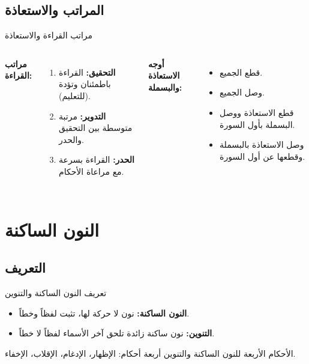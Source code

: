 \documentclass[aspectratio=169, 12pt]{beamer}
\begin{document}
\subsection{المراتب والاستعاذة}
\begin{frame}{مراتب القراءة والاستعاذة}
    \begin{columns}
        \textbf{مراتب القراءة:}
        \begin{enumerate}
            \item \textbf{التحقيق:} القراءة باطمئنان وتؤدة (للتعليم).
            \item \textbf{التدوير:} مرتبة متوسطة بين التحقيق والحدر.
            \item \textbf{الحدر:} القراءة بسرعة مع مراعاة الأحكام.
        \end{enumerate}

        \textbf{أوجه الاستعاذة والبسملة:}
        \begin{itemize}
            \item قطع الجميع.
            \item وصل الجميع.
            \item قطع الاستعاذة ووصل البسملة بأول السورة.
            \item وصل الاستعاذة بالبسملة وقطعها عن أول السورة.
        \end{itemize}
    \end{columns}
\end{frame}

\section{النون الساكنة}
\subsection{التعريف}

\begin{frame}{تعريف النون الساكنة والتنوين}
    \begin{itemize}
        \item \textbf{النون الساكنة:} نون لا حركة لها، تثبت لفظاً وخطاً.
        \item \textbf{التنوين:} نون ساكنة زائدة تلحق آخر الأسماء لفظاً لا خطاً.
    \end{itemize}
    \begin{alertblock}{الأحكام الأربعة}
        للنون الساكنة والتنوين أربعة أحكام: الإظهار، الإدغام، الإقلاب، الإخفاء.
    \end{alertblock}
\end{frame}
\end{document}
